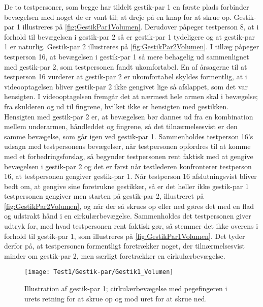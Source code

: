 \noindent
%
De to testpersoner, som begge har tildelt gestik-par 1 en første plads forbinder bevægelsen med noget de er vant til; at dreje på en knap for at skrue op. Gestik-par 1 illustreres på \autoref{fig:GestikPar1Volumen}. Derudover påpeger testperson 8, at i forhold til bevægelsen i gestik-par 2 så er gestik-par 1 tydeligere og at gestik-par 1 er naturlig. Gestik-par 2 illustreres på \autoref{fig:GestikPar2Volumen}. I tillæg påpeger testperson 16, at bevægelsen i gestik-par 1 så mere behagelig ud sammenlignet med gestik-par 2, som testpersonen fandt ukomfortabel. En af årsagerne til at testperson 16 vurderer at gestik-par 2 er ukomfortabel skyldes formentlig, at i videooptagelsen bliver gestik-par 2 ikke gengivet lige så afslappet, som det var hensigten. I videooptagelsen fremgår det at nærmest hele armen skal i bevægelse; fra skulderen og ud til fingrene, hvilket ikke er hensigten med gestikken. Hensigten med gestik-par 2 er, at bevægelsen bør dannes ud fra en kombination mellem underarmen, håndleddet og fingrene, så det tilnærmelsesvist er den samme bevægelse, som går igen ved gestik-par 1. Sammenholdes testperson 16’s udsagn med testpersonens bevægelser, når testpersonen opfordres til at komme med et forbedringsforslag, så begynder testpersonen rent faktisk med at gengive bevægelsen i gestik-par 2 og det er først når testlederen konfronterer testperson 16, at testpersonen gengiver gestik-par 1. Når testperson 16 afslutningsvist bliver bedt om, at gengive sine foretrukne gestikker, så er det heller ikke gestik-par 1 testpersonen gengiver men starten på gestik-par 2, illustreret på \autoref{fig:GestikPar2Volumen}, og når der så skrues op eller ned gøres det med en flad og udstrakt hånd i en cirkulærbevægelse. Sammenholdes det testpersonen giver udtryk for, med hvad testpersonen rent faktisk gør, så stemmer det ikke overens i forhold til gestik-par 1, som illustreres på \autoref{fig:GestikPar1Volumen}. Det tyder derfor på, at testpersonen formentligt foretrækker noget, der tilnærmelsesvist minder om gestik-par 2, men særligt foretrækker en cirkulærbevægelse.
%
\begin{figure}[H]
	\centering
	\texttt{[image: Test1/Gestik-par/Gestik1\_Volumen]}
	\caption{Illustration af gestik-par 1; cirkulærbevægelse med pegefingeren i urets retning for at skrue op og mod uret for at skrue ned.}
	\label{fig:GestikPar1Volumen}
\end{figure}
\noindent
%
